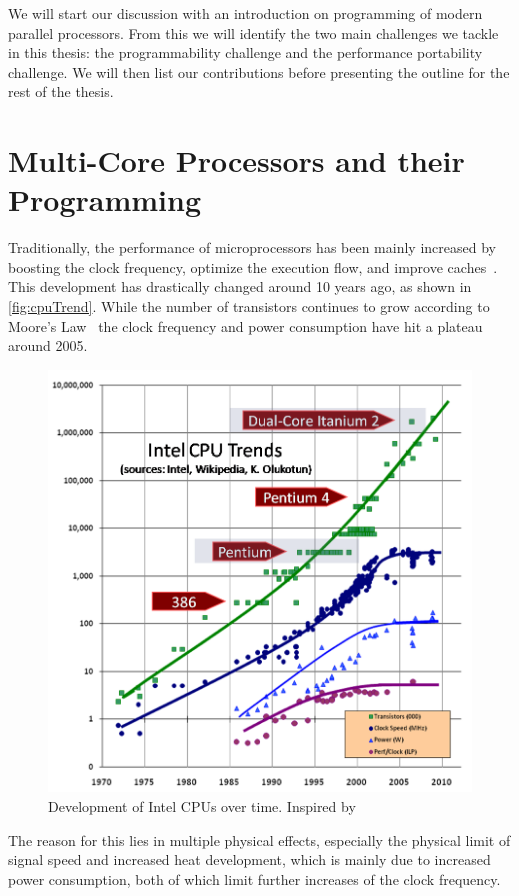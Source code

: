 \noindent
We will start our discussion with an introduction on programming of modern parallel processors.
From this we will identify the two main challenges we tackle in this thesis:
the programmability challenge and the performance portability challenge.
We will then list our contributions before presenting the outline for the rest of the thesis.

\section{Multi-Core Processors and their Programming}

Traditionally, the performance of microprocessors has been mainly increased by boosting the clock frequency, optimize the execution flow, and improve caches~\cite{Sutter2005}.
This development has drastically changed around 10 years ago, as shown in \autoref{fig:cpuTrend}.
While the number of transistors continues to grow according to Moore's Law~\cite{Moore1998} the clock frequency and power consumption have hit a plateau around 2005.
\begin{figure}
  \centering
  \includegraphics[width=.9\linewidth]{Figures/CPUTrend.png}
  \caption{Development of Intel CPUs over time. Inspired by~\cite{Sutter2005}}
  \label{fig:cpuTrend}
\end{figure} 
The reason for this lies in multiple physical effects, especially the physical limit of signal speed and increased heat development, which is mainly due to increased power consumption, both of which limit further increases of the clock frequency.
